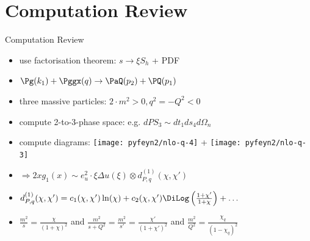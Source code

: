 \section{Computation Review}
\begin{frame}{Computation Review}
\begin{itemize}
\item use factorisation theorem: $s\to \xi S_h$ + PDF
\item $\Pg(k_1) + \Pggx(q) \to \PaQ(p_2) + \PQ(p_1)$
\item three massive particles: $2\cdot m^2>0,q^2=-Q^2<0$
\item compute 2-to-3-phase space: e.g. $dPS_3 \sim dt_1ds_4d\Omega_n$
\item compute diagrams: \texttt{[image: pyfeyn2/nlo-q-4]} + \texttt{[image: pyfeyn2/nlo-q-3]}
\item $\Rightarrow 2xg_1(x) \sim e_u^2\cdot \xi\Delta u(\xi) \otimes d_{P,q}^{(1)}(\chi,\chi')$
\item $d_{P,q}^{(1)}(\chi,\chi') = c_1(\chi,\chi')\ln(\chi) + c_2(\chi,\chi')\DiLog\left(\frac{1+\chi'}{1+\chi}\right)+\ldots$ \checkmark
\item $\frac{m^2}{s} = \frac{\chi}{(1+\chi)^2}$ and $\frac{m^2}{s+Q^2} = \frac{m^2}{s'} = \frac{\chi'}{(1+\chi')^2}$ and $\frac{m^2}{Q^2} = \frac{\chi_q}{(1-\chi_q)^2}$
\end{itemize}
\end{frame}


